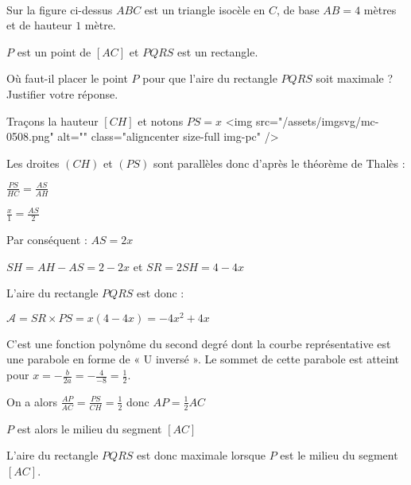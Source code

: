 
%
\\ 
 \begin{center}
      \end{center}
Sur la figure ci-dessus $ABC$ est un triangle isocèle en $C$, de base $AB= 4$ mètres et de hauteur $1$ mètre.
\par
$P$ est un point de $\left[AC\right]$ et $PQRS$ est un rectangle.
\par
Où faut-il placer le point $P$ pour que l'aire du rectangle $PQRS$ soit maximale ? Justifier votre réponse.
\begin{corrige}
     Traçons la hauteur $\left[CH\right]$ et notons $PS=x$
     <img src="/assets/imgsvg/mc-0508.png" alt="" class="aligncenter size-full  img-pc" />

\begin{center}
\end{center}
     Les droites $\left(CH\right)$ et $\left(PS\right)$ sont parallèles donc d'après le théorème de Thalès :
     \par
     $\frac{PS}{HC}=\frac{AS}{AH}$
     \par
     $\frac{x}{1}=\frac{AS}{2}$
     \par
     Par conséquent : $AS=2x$
     \par
     $SH=AH-AS=2-2x$ et $SR=2SH=4-4x$
     \par
     L'aire du rectangle $PQRS$ est donc :
     \par
     $\mathscr A=SR\times PS=x\left(4-4x\right)=-4x^{2}+4x$
     \par
     C'est une fonction polynôme du second degré dont la courbe représentative est une parabole en forme de « U inversé ». Le sommet de cette parabole est atteint pour $x=-\frac{b}{2a}=-\frac{4}{-8}=\frac{1}{2}$.
     \par
     On a alors $\frac{AP}{AC}=\frac{PS}{CH}=\frac{1}{2}$ donc $AP=\frac{1}{2}AC$
     \par
     $P$ est alors le milieu du segment $\left[AC\right]$
     \par
     L'aire du rectangle $PQRS$ est donc maximale lorsque $P$ est le milieu du segment $\left[AC\right]$.
\end{corrige}
